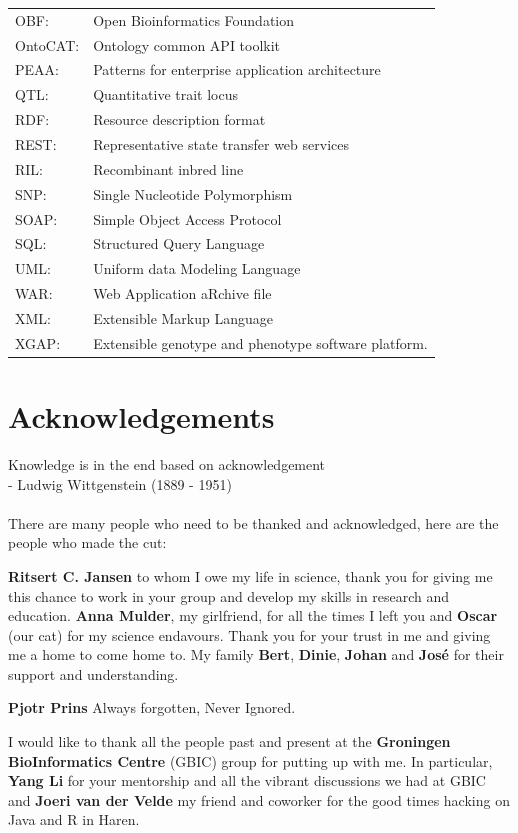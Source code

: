 {\begin{tabular}{ l l }
OBF:         & Open Bioinformatics Foundation\\
OntoCAT:     & Ontology common API toolkit\\
PEAA:        & Patterns for enterprise application architecture\\
QTL:         & Quantitative trait locus\\
RDF:         & Resource description format\\
REST:        & Representative state transfer web services\\
RIL:         & Recombinant inbred line \\
SNP:         & Single Nucleotide Polymorphism\\
SOAP:        & Simple Object Access Protocol\\
SQL:         & Structured Query Language\\
UML:         & Uniform data Modeling Language\\
WAR:         & Web Application aRchive file\\
XML:         & Extensible Markup Language\\
XGAP:        & Extensible genotype and phenotype software platform. 
\end{tabular}
}
\newpage

\section{Acknowledgements}
Knowledge is in the end based on acknowledgement\\
- Ludwig Wittgenstein (1889 - 1951)\\\\

There are many people who need to be thanked and acknowledged, 
here are the people who made the cut:

{\bf Ritsert C. Jansen} to whom I owe my life in science, thank you for giving me this chance 
to work in your group and develop my skills in research and education. {\bf Anna Mulder}, my 
girlfriend, for all the times I left you and {\bf Oscar} (our cat) for my science endavours. 
Thank you for your trust in me and giving me a home to come home to.
My family {\bf Bert}, {\bf Dinie}, {\bf Johan} and {\bf Jos\'{e}} for their support and understanding. 

{\bf Pjotr Prins} Always forgotten, Never Ignored. 

I would like to thank all the people past and present at the {\bf Groningen BioInformatics Centre} 
(GBIC) group for putting up with me. In particular, {\bf Yang Li} for your mentorship and all the 
vibrant discussions we had at GBIC and {\bf Joeri van der Velde} my friend and coworker for the 
good times hacking on Java and R in Haren.

